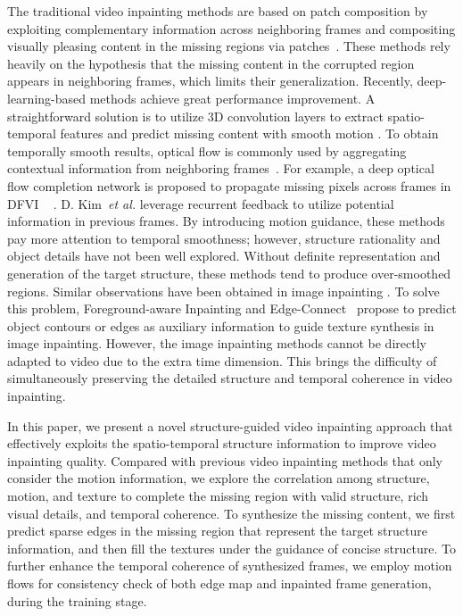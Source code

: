 The traditional video inpainting methods are based on patch composition by exploiting complementary information across neighboring frames and compositing visually pleasing content in the missing regions via patches~\cite{patwardhan2007video,wexler2004space,newson2014video}.
% 
These methods rely heavily on the hypothesis that the missing content in the corrupted region appears in neighboring frames, which limits their generalization.
%
Recently, deep-learning-based methods achieve great performance improvement.
A straightforward solution is to utilize 3D convolution layers to extract spatio-temporal features and predict missing content with smooth motion \cite{wang2019video}.
To obtain temporally smooth results, optical flow is commonly used by aggregating contextual information from neighboring frames~\cite{Kim_2019_CVPR,Xu_2019_CVPR,Kim_2019_CVPR1}.
For example, a deep optical flow completion network is proposed to propagate missing pixels across frames in DFVI ~\cite{Xu_2019_CVPR} . D. Kim~\emph{et al.} \cite{Kim_2019_CVPR,Kim_2019_CVPR1} leverage recurrent feedback to utilize potential information in previous frames.
By introducing motion guidance, these methods pay more attention to temporal smoothness; however, structure rationality and object details have not been well explored. 
%
Without definite representation and generation of the target structure, these methods tend to produce over-smoothed regions. 
Similar observations have been obtained in image inpainting \cite{Xiong_2019_CVPR,nazeri2019edgeconnect}.
To solve this problem, Foreground-aware Inpainting \cite{Xiong_2019_CVPR} and  Edge-Connect~\cite{nazeri2019edgeconnect} propose to predict object contours or edges as auxiliary information to guide texture synthesis in image inpainting.
%
However, the image inpainting methods cannot be directly adapted to video due to the extra time dimension.
This brings the difficulty of simultaneously preserving the detailed structure and temporal coherence in video inpainting.




In this paper, we present a novel structure-guided video inpainting approach that effectively exploits the spatio-temporal structure information to improve video inpainting quality.  
Compared with previous video inpainting methods that only consider the motion information,  we explore the correlation among structure, motion, and texture to complete the missing region with valid structure, rich visual details, and temporal coherence.
%
To synthesize the missing content, we first predict sparse edges in the missing region that represent the target structure information, and then fill the textures under the guidance of concise structure.
To further enhance the temporal coherence of synthesized frames, we employ motion flows for consistency check of both edge map and inpainted frame generation, during the training stage.



